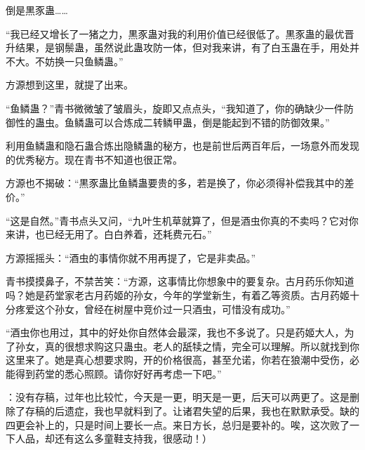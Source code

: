 \begin{this_body}
倒是黒豕蛊……

“我已经又增长了一猪之力，黒豕蛊对我的利用价值已经很低了。黒豕蛊的最优晋升结果，是钢鬃蛊，虽然说此蛊攻防一体，但对我来讲，有了白玉蛊在手，用处并不大。不妨换一只鱼鳞蛊。”

方源想到这里，就提了出来。

“鱼鳞蛊？”青书微微皱了皱眉头，旋即又点点头，“我知道了，你的确缺少一件防御性的蛊虫。鱼鳞蛊可以合炼成二转鳞甲蛊，倒是能起到不错的防御效果。”

利用鱼鳞蛊和隐石蛊合炼出隐鳞蛊的秘方，也是前世后两百年后，一场意外而发现的优秀秘方。现在青书不知道也很正常。

方源也不揭破：“黒豕蛊比鱼鳞蛊要贵的多，若是换了，你必须得补偿我其中的差价。”

“这是自然。”青书点头又问，“九叶生机草就算了，但是酒虫你真的不卖吗？它对你来讲，也已经无用了。白白养着，还耗费元石。”

方源摇摇头：“酒虫的事情你就不用再提了，它是非卖品。”

青书摸摸鼻子，不禁苦笑：“方源，这事情比你想象中的要复杂。古月药乐你知道吗？她是药堂家老古月药姬的孙女，今年的学堂新生，有着乙等资质。古月药姬十分疼爱这个孙女，曾经在树屋中竞价过一只酒虫，可惜没有成功。”

“酒虫你也用过，其中的好处你自然体会最深，我也不多说了。只是药姬大人，为了孙女，真的很想求购这只蛊虫。老人的舐犊之情，完全可以理解。所以就找到你这里来了。她是真心想要求购，开的价格很高，甚至允诺，你若在狼潮中受伤，必能得到药堂的悉心照顾。请你好好再考虑一下吧。”

：没有存稿，过年也比较忙，今天是一更，明天是一更，后天可以两更了。这是删除了存稿的后遗症，我也早就料到了。让诸君失望的后果，我也在默默承受。缺的四更会补上的，只是时间上要长一点。来日方长，总归是要补的。唉，这次败了一下人品，却还有这么多童鞋支持我，很感动！）

\end{this_body}

